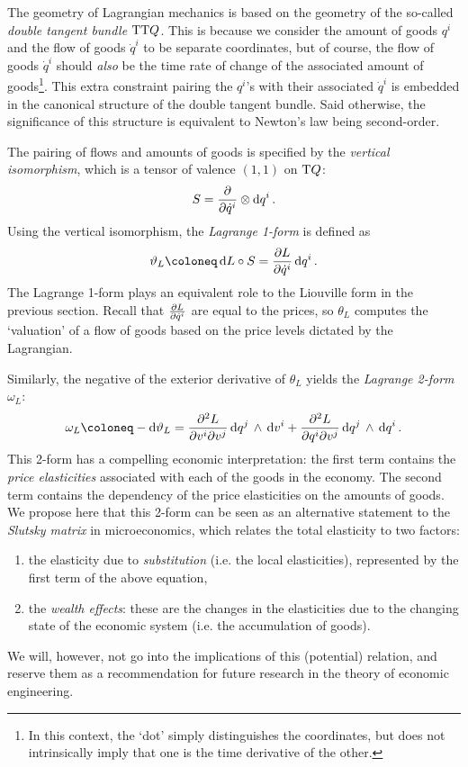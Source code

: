 The geometry of Lagrangian mechanics is based on the geometry of the so-called \emph{double tangent bundle} \(\mathrm{T}\mathrm{T}Q\). This is because we consider the amount of goods \(q^i\) and the flow of goods \(\dot{q}^i\) to be separate coordinates, but of course, the flow of goods \(\dot{q}^i\) should \emph{also} be the time rate of change of the associated amount of goods\footnote{In this context, the `dot' simply distinguishes the coordinates, but does not intrinsically imply that one is the time derivative of the other.}. This extra constraint pairing the \(q^i\)'s with their associated \(\dot{q}^i\) is embedded in the canonical structure of the double tangent bundle. Said otherwise, the significance of this structure is equivalent to Newton's law being second-order.

The pairing of flows and amounts of goods is specified by the \emph{vertical isomorphism}, which is a tensor of valence \((1,1)\) on \(\mathrm{T}Q\): \cite{Carinena1990}
\begin{equation}
    S = \pdv{}{\dot{q}^i}\otimes \dd{q^i}.
\end{equation}
Using the vertical isomorphism, the \emph{Lagrange 1-form} is defined as
\begin{equation}
    \theta_L \coloneq \dd{L}\circ S = \pdv{L}{\dot{q}^i}\dd{q^i}.
\end{equation}
The Lagrange 1-form plays an equivalent role to the Liouville form in the previous section. Recall that \(\pdv{L}{\dot{q}^i}\) are equal to the prices, so \(\theta_L\) computes the `valuation' of a flow of goods based on the price levels dictated by the Lagrangian. 

Similarly, the negative of the exterior derivative of \(\theta_L\) yields the \emph{Lagrange 2-form} \(\omega_L\):
\begin{equation}
    \omega_L \coloneq -\dd{\theta_L} = \pdv[2]{L}{v^i}{v^j}\wedgep{\dd{q^j}}{\dd{v^i}} + \pdv[2]{L}{q^i}{v^j}\wedgep{\dd{q^j}}{\dd{q^i}}.
\end{equation}
This 2-form has a compelling economic interpretation: the first term contains the \emph{price elasticities} associated with each of the goods in the economy. The second term contains the dependency of the price elasticities on the amounts of goods.
We propose here that this 2-form can be seen as an alternative statement to the \emph{Slutsky matrix} in microeconomics, which relates the total elasticity to two factors: \cite{varianhalr1992}
\begin{enumerate}[label=(\roman*), noitemsep]
    \item the elasticity due to \emph{substitution} (i.e. the local elasticities), represented by the first term of the above equation, 
    \item the \emph{wealth effects}: these are the changes in the elasticities due to the changing state of the economic system (i.e. the accumulation of goods).
\end{enumerate}
We will, however, not go into the implications of this (potential) relation, and reserve them as a recommendation for future research in the theory of economic engineering.

